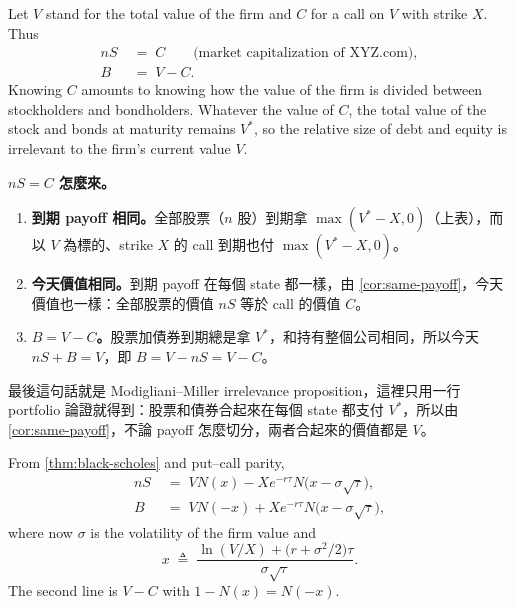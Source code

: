 Let $V$ stand for the total value of the firm and $C$ for a call on $V$ with strike $X$.
Thus
\begin{align*}
	nS & \;=\; C \qquad\text{(market capitalization of XYZ.com)}, \\
	B  & \;=\; V-C .
\end{align*}
Knowing $C$ amounts to knowing how the value of the firm is divided between stockholders and bondholders.
Whatever the value of $C$, the total value of the stock and bonds at maturity remains $V^{*}$, so the relative size of debt and equity is irrelevant to the firm's current value $V$.

\suppstart
{}

\begin{remark}
	\textbf{$nS=C$ 怎麼來。}
	\begin{enumerate}[(1),nosep]
		\item \textbf{到期 payoff 相同。}全部股票（$n$ 股）到期拿 $\max(V^{*}-X,0)$（上表），而以 $V$ 為標的、strike $X$ 的 call 到期也付 $\max(V^{*}-X,0)$。
		\item \textbf{今天價值相同。}到期 payoff 在每個 state 都一樣，由 \autoref{cor:same-payoff}，今天價值也一樣：全部股票的價值 $nS$ 等於 call 的價值 $C$。
		\item \textbf{$B=V-C$。}股票加債券到期總是拿 $V^{*}$，和持有整個公司相同，所以今天 $nS+B=V$，即 $B=V-nS=V-C$。
	\end{enumerate}
\end{remark}

\begin{note}
	最後這句話就是 Modigliani--Miller irrelevance proposition，這裡只用一行 portfolio 論證就得到：股票和債券合起來在每個 state 都支付 $V^{*}$，所以由 \autoref{cor:same-payoff}，不論 payoff 怎麼切分，兩者合起來的價值都是 $V$。
\end{note}
\suppend


From \autoref{thm:black-scholes} and put--call parity,
\begin{align}
	nS & \;=\; VN(x)-Xe^{-r\tau}N\bigl(x-\sigma\sqrt{\tau}\bigr) , \label{eq:merton-stock} \\
	B  & \;=\; VN(-x)+Xe^{-r\tau}N\bigl(x-\sigma\sqrt{\tau}\bigr) , \label{eq:merton-bond}
\end{align}
where now $\sigma$ is the volatility of the firm value and
\[
	x \;\triangleq\; \frac{\ln(V/X)+\bigl(r+\sigma^{2}/2\bigr)\tau}{\sigma\sqrt{\tau}} .
\]
\suppstart
The second line is $V-C$ with $1-N(x)=N(-x)$.

